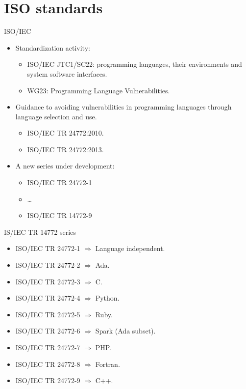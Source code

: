 \section{ISO standards}

\begin{frame}[t]{ISO/IEC}
\begin{itemize}
  \item Standardization activity:
    \begin{itemize}
      \item ISO/IEC JTC1/SC22: programming languages, their environments and system software interfaces.
      \item WG23: Programming Language Vulnerabilities.
    \end{itemize}

  \vfill\pause
  \item Guidance to avoiding vulnerabilities in programming languages through language selection and use.
    \begin{itemize}
      \item ISO/IEC TR 24772:2010.
      \item ISO/IEC TR 24772:2013.
    \end{itemize}

  \vfill\pause
  \item A new series under development:
    \begin{itemize}
      \item ISO/IEC TR 24772-1
      \item \ldots
      \item ISO/IEC TR 14772-9
    \end{itemize} 
\end{itemize}
\end{frame}

\begin{frame}[t]{IS/IEC TR 14772 series}
\begin{itemize}
  \item ISO/IEC TR 24772-1 $\Rightarrow$ Language independent.
  \item ISO/IEC TR 24772-2 $\Rightarrow$ Ada.
  \item ISO/IEC TR 24772-3 $\Rightarrow$ C.
  \item ISO/IEC TR 24772-4 $\Rightarrow$ Python.
  \item ISO/IEC TR 24772-5 $\Rightarrow$ Ruby.
  \item ISO/IEC TR 24772-6 $\Rightarrow$ Spark (Ada subset).
  \item ISO/IEC TR 24772-7 $\Rightarrow$ PHP.
  \item ISO/IEC TR 24772-8 $\Rightarrow$ Fortran.
  \item ISO/IEC TR 24772-9 $\Rightarrow$ C++.
\end{itemize}
\end{frame}

